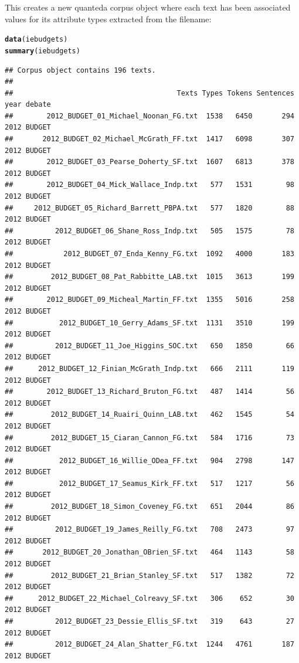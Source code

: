 \documentclass[11pt]{article}\usepackage[]{graphicx}\usepackage[]{color}
\makeatletter
\newcommand{\hlstd}[1]{\textcolor[rgb]{0.345,0.345,0.345}{#1}}%
\newcommand{\hlkwd}[1]{\textcolor[rgb]{0.737,0.353,0.396}{\textbf{#1}}}%
\newenvironment{kframe}{%
 \def\at@end@of@kframe{}%
 \ifinner\ifhmode%
  \def\at@end@of@kframe{\end{minipage}}%
  \begin{minipage}{\columnwidth}%
 \fi\fi%
 \def\FrameCommand##1{\hskip\@totalleftmargin \hskip-\fboxsep
 \colorbox{shadecolor}{##1}\hskip-\fboxsep
     \hskip-\linewidth \hskip-\@totalleftmargin \hskip\columnwidth}%
 \MakeFramed {\advance\hsize-\width
   \@totalleftmargin\z@ \linewidth\hsize
   \@setminipage}}%
 {\par\unskip\endMakeFramed%
 \at@end@of@kframe}
\newenvironment{knitrout}{}{} %
\makeatother
\begin{document}
This creates a new quanteda corpus object where each text has been associated values for its attribute types extracted from the filename:

\begin{knitrout}
\color{fgcolor}\begin{kframe}
\begin{alltt}
\hlkwd{data}\hlstd{(iebudgets)}
\hlkwd{summary}\hlstd{(iebudgets)}
\end{alltt}
\begin{verbatim}
## Corpus object contains 196 texts.
## 
##                                       Texts Types Tokens Sentences year debate
##        2012_BUDGET_01_Michael_Noonan_FG.txt  1538   6450       294 2012 BUDGET
##       2012_BUDGET_02_Michael_McGrath_FF.txt  1417   6098       307 2012 BUDGET
##        2012_BUDGET_03_Pearse_Doherty_SF.txt  1607   6813       378 2012 BUDGET
##        2012_BUDGET_04_Mick_Wallace_Indp.txt   577   1531        98 2012 BUDGET
##     2012_BUDGET_05_Richard_Barrett_PBPA.txt   577   1820        88 2012 BUDGET
##          2012_BUDGET_06_Shane_Ross_Indp.txt   505   1575        78 2012 BUDGET
##            2012_BUDGET_07_Enda_Kenny_FG.txt  1092   4000       183 2012 BUDGET
##         2012_BUDGET_08_Pat_Rabbitte_LAB.txt  1015   3613       199 2012 BUDGET
##        2012_BUDGET_09_Micheal_Martin_FF.txt  1355   5016       258 2012 BUDGET
##           2012_BUDGET_10_Gerry_Adams_SF.txt  1131   3510       199 2012 BUDGET
##          2012_BUDGET_11_Joe_Higgins_SOC.txt   650   1850        66 2012 BUDGET
##      2012_BUDGET_12_Finian_McGrath_Indp.txt   666   2111       119 2012 BUDGET
##        2012_BUDGET_13_Richard_Bruton_FG.txt   487   1414        56 2012 BUDGET
##         2012_BUDGET_14_Ruairi_Quinn_LAB.txt   462   1545        54 2012 BUDGET
##         2012_BUDGET_15_Ciaran_Cannon_FG.txt   584   1716        73 2012 BUDGET
##           2012_BUDGET_16_Willie_ODea_FF.txt   904   2798       147 2012 BUDGET
##           2012_BUDGET_17_Seamus_Kirk_FF.txt   517   1217        56 2012 BUDGET
##         2012_BUDGET_18_Simon_Coveney_FG.txt   651   2044        86 2012 BUDGET
##          2012_BUDGET_19_James_Reilly_FG.txt   708   2473        97 2012 BUDGET
##       2012_BUDGET_20_Jonathan_OBrien_SF.txt   464   1143        58 2012 BUDGET
##         2012_BUDGET_21_Brian_Stanley_SF.txt   517   1382        72 2012 BUDGET
##      2012_BUDGET_22_Michael_Colreavy_SF.txt   306    652        30 2012 BUDGET
##          2012_BUDGET_23_Dessie_Ellis_SF.txt   319    643        27 2012 BUDGET
##          2012_BUDGET_24_Alan_Shatter_FG.txt  1244   4761       187 2012 BUDGET

\end{verbatim}
\end{kframe}
\end{knitrout}
\end{document}
